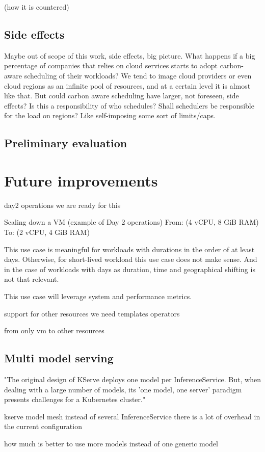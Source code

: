 (how it is countered)

\subsection{Side effects}

Maybe out of scope of this work, side effects, big picture.
What happens if a big percentage of companies that relies on cloud services starts to adopt carbon-aware scheduling of their workloads?
We tend to image cloud providers or even cloud regions as an infinite pool of resources, and at a certain level it is almost like that. But could carbon aware scheduling have larger, not foreseen, side effects?
Is this a responsibility of who schedules? Shall schedulers be responsible for the load on regions? Like self-imposing some sort of limits/caps.

\subsection{Preliminary evaluation}

\section{Future improvements}

day2 operations
we are ready for this

Scaling down a VM (example of Day 2 operations)
From: (4 vCPU, 8 GiB RAM)
To: (2 vCPU, 4 GiB RAM)

This use case is meaningful for workloads with durations in the order of at least days. Otherwise, for short-lived workload this use case does not make sense.
And in the case of workloads with days as duration, time and geographical shifting is not that relevant.

This use case will leverage system and performance metrics.



support for other resources
we need
templates
operators

from only vm 
to other resources


\subsection{Multi model serving}

"The original design of KServe deploys one model per InferenceService. But, when dealing with a large number of models, its 'one model, one server' paradigm presents challenges for a Kubernetes cluster."

kserve model mesh instead of several InferenceService
there is a lot of overhead in the current configuration

how much is better to use more models instead of one generic model 




\newpage
